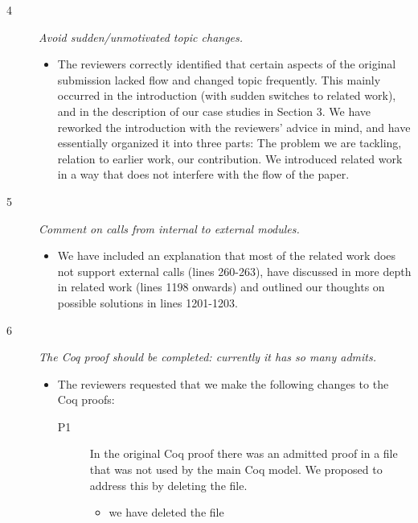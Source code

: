 \documentclass[11pt]{amsart}
\begin{document}
\begin{description}
\begin{itemize}
 \end{itemize}
 
 \item[4]
 \emph{
 Avoid sudden/unmotivated topic changes.
 }
 \begin{itemize}
 \item
 The reviewers correctly identified that certain
  	aspects of the original submission lacked flow and changed 
  	topic frequently. This mainly occurred in the introduction 
  	(with sudden switches to related work), and in the description
  	of our case studies in Section 3. We have reworked the introduction
  	with the reviewers' advice in mind, and have essentially
	organized it into three parts: The problem we are tackling, relation to earlier work, our contribution.
  	We introduced related work   in a way that does not interfere with the flow 
  	of the paper. 
 \end{itemize}
 
 \item[5]
 \emph{
 Comment on calls from internal to external modules.
 }
 \begin{itemize}
 \item
 We have included an explanation that most of the related work does not support external calls  {(lines 260-263)}, 
 have discussed in more depth in related work (lines 1198 onwards) and outlined our thoughts on possible solutions in lines 1201-1203.
  \end{itemize}
 
 \item[6]
 \emph{
 The Coq proof should be completed: currently it has so many admits.
 }
 \begin{itemize}
 \item
The reviewers requested that we make the following changes to the Coq proofs:

\begin{description}
\item[P1] 
In the original Coq proof there was an admitted proof in a file that was 
not used by the main Coq model.
We proposed to address this by deleting the file.
\begin{itemize}
\item we have deleted the file
\end{itemize}


\end{description}
\end{itemize}
\end{description}
\end{document}
